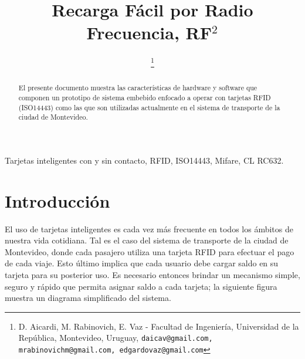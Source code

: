 \documentclass[%
        final,
        notitlepage,
        narroweqnarray,
        inline,
        ]{ieee}
\begin{document}
\title[RF$^{2}$]{%
       Recarga Fácil por Radio Frecuencia, RF$^{2}$}

\author[D. Aicardi, M. Rabinovich, E. Vaz]{%
	\thanks{D. Aicardi, M. Rabinovich, E. Vaz - Facultad de Ingeniería, Universidad de la República, Montevideo, Uruguay,
		{\tt\small daicav@gmail.com, mrabinovichm@gmail.com, edgardovaz@gmail.com} }
}





\maketitle               

\begin{abstract}
El presente documento muestra las características de hardware y software que componen un prototipo de sistema embebido enfocado a operar con tarjetas RFID (ISO14443) como las que son utilizadas actualmente en el sistema de transporte de la ciudad de Montevideo.
\end{abstract}


\begin{keywords}
Tarjetas inteligentes con y sin contacto, RFID, ISO14443, Mifare, CL RC632.
\end{keywords}

\section{Introducción}

\PARstart El uso de tarjetas inteligentes es cada vez más frecuente en todos los ámbitos de nuestra vida cotidiana. 
Tal es el caso del sistema de transporte de la ciudad de Montevideo, donde cada pasajero utiliza una tarjeta RFID 
para efectuar el pago de cada viaje. Esto último implica que cada usuario debe cargar saldo en su tarjeta para su 
posterior uso. Es necesario entonces brindar un mecanismo simple, seguro y rápido que permita asignar saldo a cada tarjeta; la siguiente figura muestra un diagrama simplificado del sistema.
\end{document}

